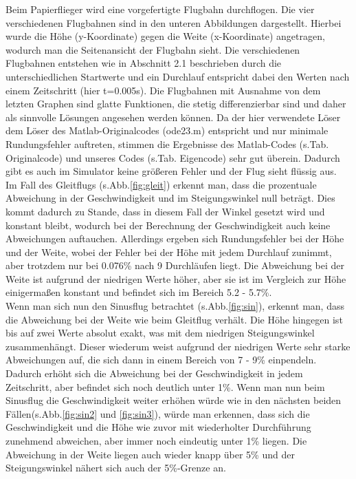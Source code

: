 \documentclass[a4paper,12pt]{scrartcl}
\begin{document}
Beim Papierflieger wird eine vorgefertigte Flugbahn durchflogen. Die vier verschiedenen
Flugbahnen sind in den unteren Abbildungen dargestellt. Hierbei wurde die Höhe (y-Koordinate) gegen
die Weite (x-Koordinate) angetragen, wodurch man die Seitenansicht der Flugbahn
sieht. Die verschiedenen Flugbahnen entstehen wie in Abschnitt 2.1 beschrieben durch
die unterschiedlichen Startwerte und ein Durchlauf entspricht dabei den Werten nach einem Zeitschritt (hier t=0.005s).  Die Flugbahnen mit Ausnahme von dem letzten Graphen sind glatte Funktionen, die stetig differenzierbar
sind und daher als sinnvolle Lösungen angesehen werden können.
Da der hier verwendete Löser dem Löser des Matlab-Originalcodes (ode23.m) entspricht
und nur minimale Rundungsfehler auftreten, stimmen die Ergebnisse des Matlab-Codes
(s.Tab. Originalcode) und unseres Codes (s.Tab. Eigencode) sehr gut überein. Dadurch gibt es auch im
Simulator keine größeren Fehler und der Flug sieht flüssig aus. \\
Im Fall des Gleitflugs (s.Abb.\ref{fig:gleit}) erkennt man, dass die prozentuale Abweichung in der Geschwindigkeit und im Steigungswinkel null beträgt. Dies kommt dadurch zu Stande, dass in diesem Fall der Winkel gesetzt wird und konstant bleibt, wodurch bei der Berechnung der Geschwindigkeit auch keine Abweichungen auftauchen. Allerdings ergeben sich Rundungsfehler bei der Höhe und der Weite, wobei der Fehler bei der Höhe mit jedem Durchlauf zunimmt, aber trotzdem nur bei 0.076\% nach 9 Durchläufen liegt. Die Abweichung bei der Weite ist aufgrund der niedrigen Werte höher, aber sie ist im Vergleich zur Höhe einigermaßen konstant und befindet sich im Bereich 5.2 - 5.7\%.\\
Wenn man sich nun den Sinusflug betrachtet (s.Abb.\ref{fig:sin}), erkennt man, dass die Abweichung bei der Weite wie beim Gleitflug verhält. Die Höhe hingegen ist bis auf zwei Werte absolut exakt, was mit dem niedrigen Steigungswinkel zusammenhängt. Dieser wiederum weist aufgrund der niedrigen Werte sehr starke Abweichungen auf, die sich dann in einem Bereich von 7 - 9\% einpendeln. Dadurch erhöht sich die Abweichung bei der Geschwindigkeit in jedem Zeitschritt, aber befindet sich noch deutlich unter 1\%. Wenn man nun beim Sinusflug die Geschwindigkeit weiter erhöhen würde wie in den nächsten beiden Fällen(s.Abb.\ref{fig:sin2} und \ref{fig:sin3}), würde man erkennen, dass sich die Geschwindigkeit und die Höhe wie zuvor mit wiederholter Durchführung zunehmend abweichen, aber immer noch eindeutig unter 1\% liegen. Die Abweichung in der Weite liegen auch wieder knapp über 5\% und der Steigungswinkel nähert sich auch der 5\%-Grenze an.\\
\end{document}
